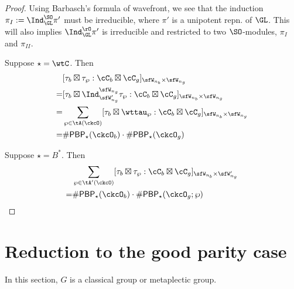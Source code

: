 \documentclass[12pt,a4paper]{amsart}
\numberwithin{equation}{section}
\theoremstyle{remark}
\def\PBP{\mathsf{PBP}}
\def\sP{\wp}
\begin{document}
\begin{proof}
{    Using Barbasch's formula of wavefront, we see that the induction $\pi_{I}:=\Ind_{\GL}^{\SO}\pi'$ must be
    irreducible, where $\pi'$ is a unipotent repn. of $\GL$.
    This will also implies $\Ind_{\GL}^{\rO}\pi'$ is irreducible and restricted
    to two $\SO$-modules, $\pi_{I}$ and $\pi_{II}$.

  }

  Suppose $\star = \wtC$.
  Then
  \[
    \begin{split}
       & [\tau_{b}\boxtimes \tau_{\wp} :
      \cC_{b} \boxtimes \cC_{g}]_{\sfW_{n_{b}}\times \sfW_{n_{g}}}\\
      = & [ \tau_{b}\boxtimes \Ind_{\sfW'_{n_{g}}}^{\sfW_{n_{g}}}\tau_{\wp} : \cC_{b} \boxtimes \cC_{g}]_{\sfW_{n_{b}}\times \sfW_{n_{g}}}\\
      = &\sum_{\sP\in \tA(\ckcO)}  [\tau_{b}\boxtimes \wttau_{\wp}:
      \cC_{b} \boxtimes \cC_{g}]_{\sfW_{n_{b}}\times \sfW_{n_{g}}}\\
      =& \# \PBP_{\star}(\ckcO_{b})\cdot \# \PBP_{\star}(\ckcO_{g})
    \end{split}
  \]

  Suppose $\star = B^{*}$.
  Then
  \[
    \begin{split}
      & \sum_{\sP\in \tA'(\ckcO)}[\tau_{b}\boxtimes \tau_{\wp} :
      \cC_{b} \boxtimes \cC_{g}]_{\sfW_{n_{b}}\times \sfW'_{n_{g}}}\\
      =& \# \PBP_{\star}(\ckcO_{b})\cdot \# \PBP_{\star}(\ckcO_{g};\wp)
    \end{split}
  \]
\end{proof}

\section{Reduction to the good parity case}

In this section, $G$ is a classical group or metaplectic group.
\end{document}
